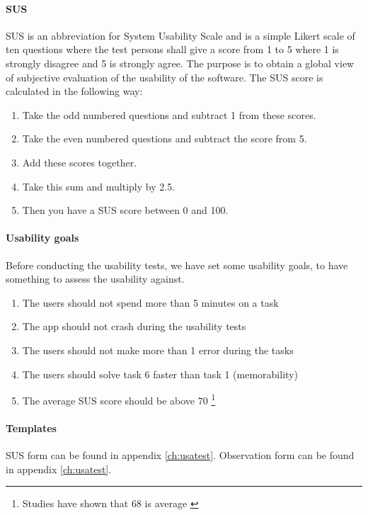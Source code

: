 \paragraph{SUS}\hfill
\newline
SUS is an abbreviation for System Usability Scale \cite{bib:sus} and is a simple Likert scale of ten questions where the test persons shall give a score from 1 to 5 where 1 is strongly disagree and 5 is strongly agree. The purpose is to obtain a global view of subjective evaluation of the usability of the software.
\newline
The SUS score is calculated in the following way:
\begin{enumerate}
\item{}Take the odd numbered questions and subtract 1 from these scores.
\item{}Take the even numbered questions and subtract the score from 5.
\item{}Add these scores together. 
\item{}Take this sum and multiply by 2.5.
\item{}Then you have a SUS score between 0 and 100.
\end{enumerate}

\paragraph{Usability goals}\hfill
\newline
Before conducting the usability tests, we have set some usability goals, to have something to assess the usability against.
\begin{enumerate}
\item{}The users should not spend more than 5 minutes on a task
\item{}The app should not crash during the usability tests
\item{}The users should not make more than 1 error during the tasks
\item{}The users should solve task 6 faster than task 1 (memorability)
\item{}The average SUS score should be above 70 \footnote{Studies have shown that 68 is average \cite{bib:susavg}}
\end{enumerate}

\paragraph{Templates}\hfill
\newline
SUS form can be found in appendix \ref{ch:usatest}.
\newline\newline
Observation form can be found in appendix \ref{ch:usatest}.


